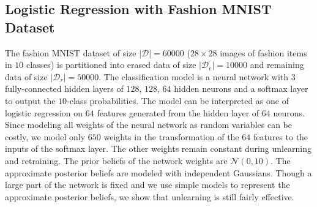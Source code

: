 \documentclass{article}
\theoremstyle{definition}
\newcommand{\mcl}[1]{\mathcal{#1}}
\newcommand{\da}{\mcl{D}}
\newcommand{\dc}{\mcl{D}_r}
\newcommand{\dr}{\mcl{D}_e}
\begin{document}
\subsection{Logistic Regression with Fashion MNIST Dataset}%
%
The fashion MNIST dataset of size $|\da| = 60000$ ($28\times28$ images of fashion items in $10$ classes) is partitioned into erased data of size $|\dr| = 10000$ and remaining data of size $|\dc| = 50000$.
The classification model is a neural network with $3$ fully-connected hidden layers of $128$, $128$, $64$ hidden neurons and a softmax layer to output the $10$-class probabilities.
The model can be interpreted as one of logistic regression on $64$ features generated from the hidden layer of $64$ neurons.
Since modeling all weights of the neural network as random variables can be costly, we model only $650$ weights in the transformation of the $64$ features to the inputs of the softmax layer.
The other weights remain constant during unlearning and retraining.
The prior beliefs of the network weights are $\mcl{N}(0, 10)$. The approximate posterior beliefs are modeled with independent Gaussians.
Though a large part of the network is fixed and we use simple models to represent the approximate posterior beliefs, we show that unlearning is still fairly effective.
\end{document}
